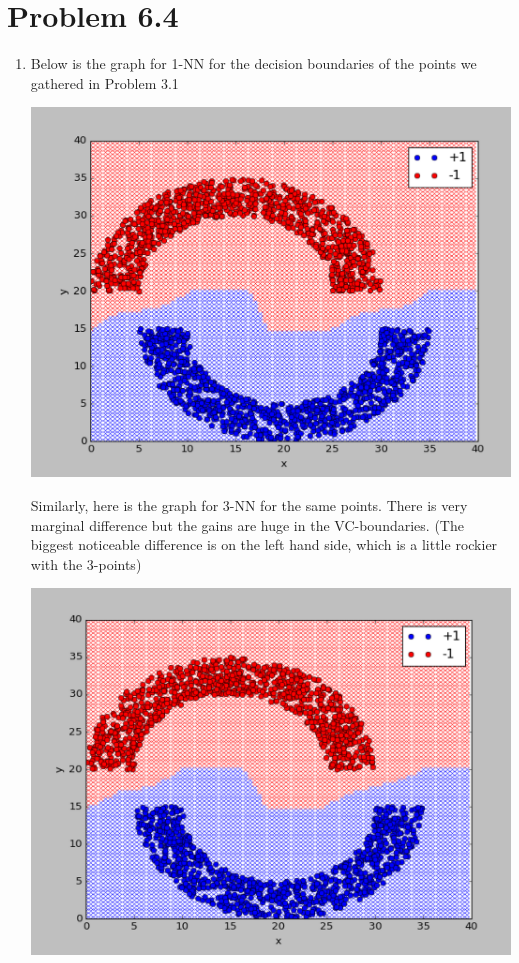 \documentclass[12pt]{article}
\begin{document}
\section*{Problem 6.4}
\begin{enumerate}[label=(\alph*)]
	\item Below is the graph for 1-NN for the decision boundaries of the points we gathered in Problem 3.1
	
	\includegraphics[scale=0.6]{6-4-1.png}
	
	Similarly, here is the graph for 3-NN for the same points. There is very marginal difference but the gains are huge in the VC-boundaries. (The biggest noticeable difference is on the left hand side, which is a little rockier with the 3-points)
	
	\includegraphics[scale=0.6]{6-4-2.png}
\end{enumerate}
\end{document}
